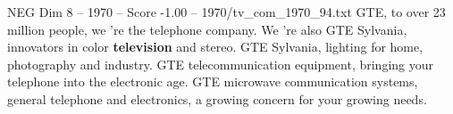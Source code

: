 \begin{textsample}{NEG Dim 8 – 1970 – Score -1.00 – 1970/tv\_com\_1970\_94.txt}  \label{ex:f8_neg_006}
GTE, to over 23 million people, we 're the telephone company.
We 're also GTE Sylvania, innovators in color \textbf{television} and stereo.
GTE Sylvania, lighting for home, photography and industry.
GTE telecommunication equipment, bringing your telephone into the electronic age.
GTE microwave communication systems, general telephone and electronics, a growing concern for your growing needs.

\end{textsample}

